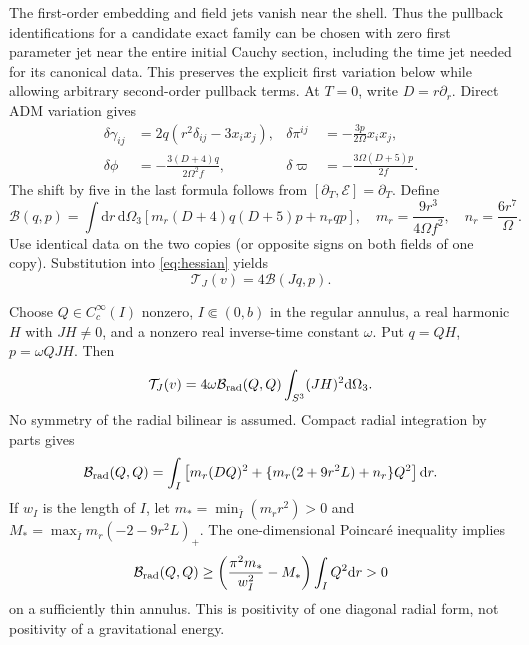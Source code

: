 \documentclass[11pt]{article}
\theoremstyle{remark}
\newcommand{\dd}{\mathrm d}
\begin{document}
The first-order embedding and field jets vanish near the shell. Thus the
pullback identifications for a candidate exact family can be chosen with
zero first parameter jet near the entire initial Cauchy section, including
the time jet needed for its canonical data. This preserves the explicit
first variation below while allowing arbitrary second-order pullback terms.
At $T=0$, write $D=r\partial_r$. Direct ADM variation gives
\begin{equation}
 \begin{aligned}
 \delta\gamma_{ij}&=2q(r^2\delta_{ij}-3x_ix_j),&
 \delta\pi^{ij}&=-\frac{3p}{2\Omega}x_ix_j,\\
 \delta\phi&=-\frac{3(D+4)q}{2\Omega^2f},&
 \delta\varpi&=-\frac{3\Omega(D+5)p}{2f}.
 \end{aligned}
 \label{eq:initial-reconstruction}
\end{equation}
The shift by five in the last formula follows from
$[\partial_T,\mathcal E]=\partial_T$.
Define
\begin{equation}
 \mathcal B(q,p)=\int\dd r\,\dd\Omega_3
 \left[m_r(D+4)q(D+5)p+n_rqp\right],\quad
 m_r=\frac{9r^3}{4\Omega f^2},\quad n_r=\frac{6r^7}{\Omega}.
 \label{eq:bilinear}
\end{equation}
Use identical data on the two copies (or opposite signs on both fields
of one copy). Substitution into \eqref{eq:hessian} yields
\begin{equation}
 \mathcal T_J(v)=4\mathcal B(Jq,p).
 \label{eq:master-charge}
\end{equation}

Choose $Q\in C_c^\infty(I)$ nonzero, $I\Subset(0,b)$ in the regular
annulus, a real harmonic $H$ with $JH\ne0$, and a nonzero real inverse-time
constant $\omega$. Put $q=QH$, $p=\omega QJH$. Then
\begin{equation}
 \mathcal T_J(v)=4\omega\mathcal B_{\rm rad}(Q,Q)
                              \int_{S^3}(JH)^2\dd\Omega_3.
 \label{eq:charge-separation}
\end{equation}
No symmetry of the radial bilinear is assumed. Compact radial integration
by parts gives
\begin{equation}
 \mathcal B_{\rm rad}(Q,Q)
 =\int_I\left[m_r(DQ)^2+
       \{m_r(2+9r^2L)+n_r\}Q^2\right]\dd r.
 \label{eq:radial-diagonal}
\end{equation}
If $w_I$ is the length of $I$, let
$m_* =\min_{\bar I}(m_rr^2)>0$ and
$M_* =\max_{\bar I}m_r(-2-9r^2L)_+$. The one-dimensional Poincar\'e
inequality implies
\begin{equation}
 \mathcal B_{\rm rad}(Q,Q)\ge
 \left(\frac{\pi^2m_*}{w_I^2}-M_*\right)\int_IQ^2\dd r>0
 \label{eq:radial-positive}
\end{equation}
on a sufficiently thin annulus. This is positivity of one diagonal radial
form, not positivity of a gravitational energy.
\end{document}
